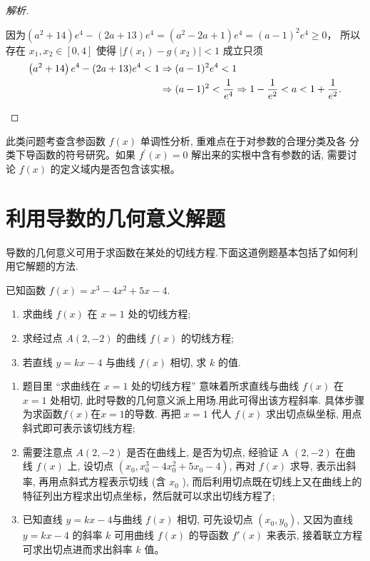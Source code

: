 \begin{proof}[解析]
\begin{enumerate}[(1)]
      因为$\left(a^{2}+14\right) e^{4}-(2 a+13) e^{4}=\left(a^{2}-2 a+1\right) e^{4}=(a-1)^{2} e^{4} \geq 0$，
      所以 存在 $x_{1}, x_{2} \in[0,4]$ 使得 $\left|f\left(x_{1}\right)-g\left(x_{2}\right)\right|<1$ 成立只须
      \[
        \begin{aligned}
          \left(a^{2}+14\right) e^{4}-(2 a+13) e^{4}<1 &\Rightarrow(a-1)^{2} e^{4}<1\\
          &\Rightarrow(a-1)^{2}<\frac{1}{e^{4}} \Rightarrow 1-\frac{1}{e^{2}}<a<1+\frac{1}{e^{2}}. \qedhere
        \end{aligned}
      \]
  \end{enumerate}
\end{proof}

\begin{review}
  此类问题考查含参函数 ${f}({x})$ 单调性分析, 重难点在于对参数的合理分类及各 分类下导函数的符号研究。如果 ${f}^{\prime}({x})=0$ 解出来的实根中含有参数的话, 需要讨论 ${f}({x})$ 的定义域内是否包含该实根。
\end{review}



\section{利用导数的几何意义解题}

导数的几何意义可用于求函数在某处的切线方程.下面这道例题基本包括了如何利用它解题的方法.

\begin{example}
  \parencite{惠红民一题一课} 已知函数 $f(x)=x^{3}-4 x^{2}+5 x-4$.
  \begin{enumerate}[(1)]
    \item 求曲线 $f(x)$ 在 $x=1$ 处的切线方程;
    \item 求经过点 $A(2,-2)$ 的曲线 $f(x)$ 的切线方程;
    \item 若直线 $y=k x-4$ 与曲线 $f(x)$ 相切, 求 $k$ 的值.
  \end{enumerate}
\end{example}


\begin{analysis}
  \begin{enumerate}[(1)]
    \item 题目里 “求曲线在 $x=1$ 处的切线方程” 意味着所求直线与曲线 $f(x)$ 在 $x=1$ 处相切, 此时导数的几何意义派上用场.用此可得出该方程斜率. 具体步骤为求函数$f(x)$在$x=1$的导数. 再把 ${x}=1$ 代人 ${f}({x})$ 求出切点纵坐标, 用点斜式即可表示该切线方程;
    \item 需要注意点 ${A}(2,-2)$ 是否在曲线上, 是否为切点, 经验证 A $(2,-2)$ 在曲线 ${f}({x})$ 上, 设切点 $\left({x}_{0}, {x}_{0}^{3}-4 {x}_{0}^{2}+5 {x}_{0}-4\right)$, 再对 ${f}({x})$ 求导, 表示出斜率, 再用点斜式方程表示切线 (含 ${x}_{0}$ ), 而后利用切点既在切线上又在曲线上的特征列出方程求出切点坐标，然后就可以求出切线方程了;
    \item 已知直线 ${y}={kx}-4$与曲线 ${f}({x})$ 相切, 可先设切点 $\left({x}_{0}, {y}_{0}\right)$, 又因为直线 ${y}={kx}-4$ 的斜率 ${k}$ 可用曲线 ${f}
    (x)$ 的导函数 $f'(x)$ 来表示, 接着联立方程可求出切点进而求出斜率 ${k}$ 值。
  \end{enumerate}
\end{analysis}

